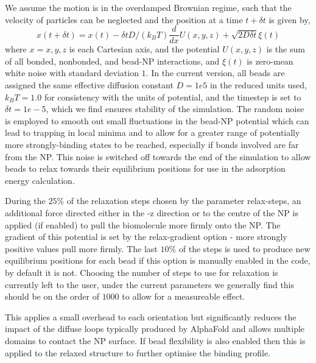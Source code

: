 \documentclass[10pt,a4paper,onecolumn]{report}
\begin{document}
We assume the motion is in the overdamped Brownian regime, such that the velocity of particles can be neglected and the position at a time $t + \delta t$ is given by,
\begin{equation}
x(t+\delta t) = x(t) - \delta t  D/(k_B T) \frac{d}{dx} U(x,y,z) + \sqrt{2 D \delta t} \xi(t)   
\end{equation}
where $x = x,y,z$ is each Cartesian axis, and the potential $U(x,y,z)$ is the sum of all bonded, nonbonded, and bead-NP interactions, and $\xi(t)$ is zero-mean white noise with standard deviation $1$. 
In the current version, all beads are assigned the same effective diffusion constant $D = 1e5$ in the reduced units used, $k_B T = 1.0$ for consistency with the units of potential, and the timestep is set to $\delta t = 1e-5$, which we find ensures stability of the simulation.
The random noise is employed to smooth out small fluctuations in the bead-NP potential which can lead to trapping in local minima and to allow for a greater range of potentially more strongly-binding states to be reached, especially if bonds involved are far from the NP. This noise is switched off towards the end of the simulation to allow beads to relax towards their equilibrium positions for use in the adsorption energy calculation.

During the $25\%$ of the relaxation steps chosen by the parameter relax-steps, an additional force directed either in the -z direction or  to the centre of the NP is applied (if enabled) to pull the biomolecule more firmly onto the NP. The gradient of this potential is set by the relax-gradient option - more strongly positive values pull more firmly.
The last $10\%$ of the steps is used to produce new equilibrium positions for each bead if this option is manually enabled in the code, by default it is not.
Choosing the number of steps to use for relaxation is currently left to the user, under the current parameters we generally find this should be on the order of $1000$ to allow for a measureable effect. 

This applies a small overhead to each orientation but significantly reduces the impact of the diffuse loops typically produced by AlphaFold and allows multiple domains to contact the NP surface. If bead flexibility is also enabled then this is applied to the relaxed structure to further optimise the binding profile.
\end{document}
